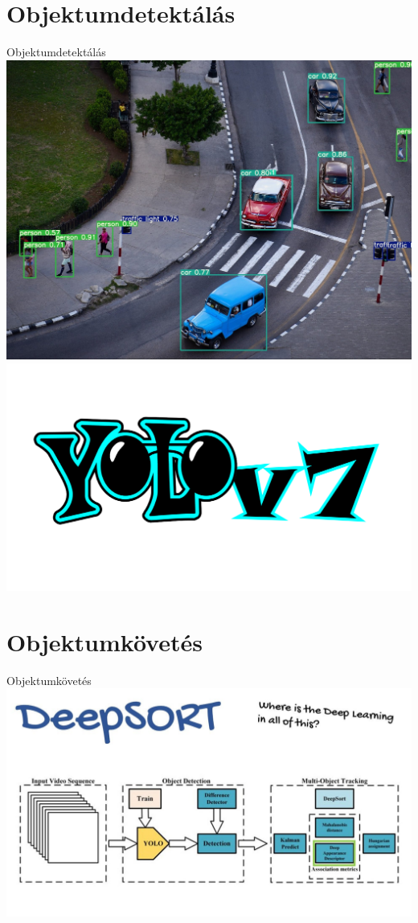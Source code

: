 \documentclass{beamer}
\begin{document}
\section{Objektumdetektálás}
\begin{frame}{Objektumdetektálás}
    \centering
    \includegraphics[scale=0.1]{yolo_img.jpg} 
    \includegraphics[scale=0.1]{yolo_logo.png}
\end{frame}

\section{Objektumkövetés}
\begin{frame}{Objektumkövetés}
    \centering
    \includegraphics[scale=0.25]{deepsort_flowchart.jpg} 
\end{frame}
\end{document}
